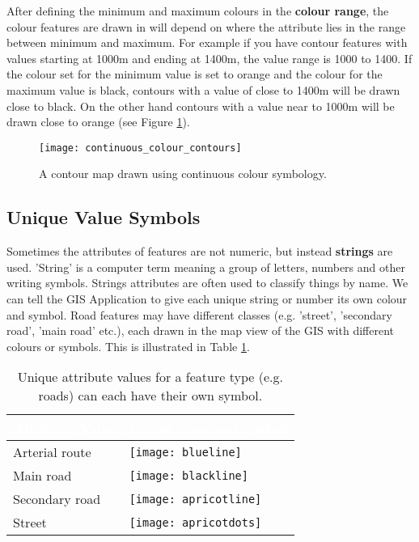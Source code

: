 After defining the minimum and maximum colours in the \textbf{colour range}, the
colour features are drawn in will depend on where the attribute lies in the
range between minimum and maximum. For example if you have contour features
with values starting at 1000m and ending at 1400m, the value range is 1000 to
1400. If the colour set for the minimum value is set to orange and the colour
for  the maximum value is black, contours with a value of close to 1400m will
be drawn close to black. On the other hand contours with a value near to
1000m will be drawn close to orange (see Figure \ref{fig:contourmap}).


\begin{figure}[ht]
   \begin{center}
   \caption{A contour map drawn using continuous colour symbology.}
\label{fig:contourmap}\smallskip
   \texttt{[image: continuous\_colour\_contours]}
\end{center}
\end{figure}

\subsection{Unique Value Symbols}

Sometimes the attributes of features are not numeric, but instead
\textbf{strings} are
used. 'String' is a computer term meaning a group of letters, numbers and
other writing symbols. Strings attributes are often used to classify things
by name. We can tell the GIS Application to give each unique string or number
its own colour and symbol. Road features may have different classes (e.g.
'street', 'secondary road', 'main road' etc.), each drawn in the map view of
the GIS with different colours or symbols. This is illustrated in Table
\ref{tab:unicolor}.

\begin{table}[ht]
\centering
\caption{Unique attribute values for a feature type (e.g. roads) can each
have their own symbol.}\medskip
 \label{tab:unicolor}
 \begin{tabular}{|p{8cm}|p{8cm}|}
 \hline
 \rowcolor{black}
 \textcolor{white}{\textbf{Attribute Value}} &
 \textcolor{white}{\textbf{Colour class and symbol}} \\
 \hline Arterial route & \texttt{[image: blueline]} \\
 \hline Main road & \texttt{[image: blackline]} \\
 \hline Secondary road & \texttt{[image: apricotline]} \\
 \hline Street & \texttt{[image: apricotdots]} \\
\hline
\end{tabular}
\end{table}

